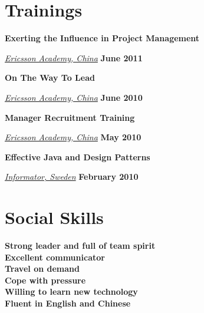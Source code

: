 
\section{Trainings}
\textbf{Exerting the Influence in Project Management}
\begin{outerlist}
\item[] \href{http://www.ericssonacademy.com/}{\textit{Ericsson Academy, China}}
        \hfill \textbf{June 2011}
\end{outerlist}
\blankline

\textbf{On The Way To Lead}
\begin{outerlist}
\item[] \href{http://www.ericssonacademy.com/}{\textit{Ericsson Academy, China}}
        \hfill \textbf{June 2010}
\end{outerlist}
\blankline

\textbf{Manager Recruitment Training}
\begin{outerlist}
\item[] \href{http://www.ericssonacademy.com/}{\textit{Ericsson Academy, China}}
        \hfill \textbf{May 2010}
\end{outerlist}
\blankline

\textbf{Effective Java and Design Patterns}
\begin{outerlist}
\item[] \href{http://www.informator.se/}{\textit{Informator, Sweden}}
        \hfill \textbf{February 2010}
\end{outerlist}


\section{Social Skills}
{\textbf{Strong leader and full of team spirit}}\\
{\textbf{Excellent communicator}}\\
{\textbf{Travel on demand}}\\
{\textbf{Cope with pressure}}\\
{\textbf{Willing to learn new technology}}\\
{\textbf{Fluent in English and Chinese}}\\

